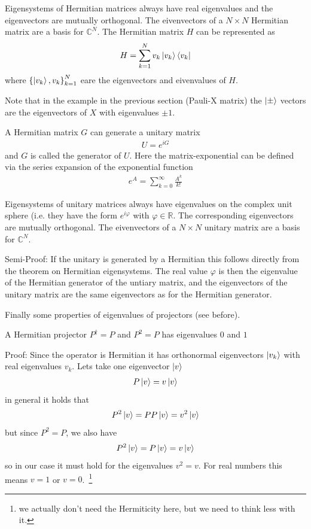 \begin{theorem*}
Eigensystems of Hermitian matrices always have real eigenvalues and the eigenvectors are mutually orthogonal. The eivenvectors of a $N\times N$ Hermitian matrix are a basis for $\mathbb{C}^N$.
The Hermitian matrix $H$ can be represented as 
\begin{align*}
    H = \sum_{k=1}^N v_k \ket{v_k}\bra{v_k}
\end{align*}
where $\left\{\ket{v_k}, v_k\right\}_{k=1}^{N}$ eare the eigenvectors and eivenvalues of $H$.
\end{theorem*}
Note that in the example in the previous section (Pauli-X matrix) the $\ket{\pm}$ vectors are the eigenvectors of $X$ with eigenvalues $\pm 1$. 

\begin{def*}[Generator]
A Hermitian matrix $G$ can generate a unitary matrix
\begin{align*}
    U = e^{iG}
\end{align*}
and $G$ is called the generator of $U$. Here the matrix-exponential can be defined via the series expansion of the exponential function
\begin{align*}
    e^{A} = \sum_{k=0}^\infty \frac{A^k}{k!}
\end{align*}
\end{def*}

\begin{theorem*}
Eigensystems of unitary matrices always have eigenvalues on the complex unit sphere (i.e. they have the form $e^{i\varphi}$ with $\varphi \in \mathbb{R}$. The corresponding eigenvectors are mutually orthogonal. The eivenvectors of a $N\times N$ unitary matrix are a basis for $\mathbb{C}^N$.
\end{theorem*}
Semi-Proof: If the unitary is generated by a Hermitian this follows directly from the theorem on Hermitian eigensystems. The real value $\varphi$ is then the eigenvalue of the Hermitian generator of the untiary matrix, and the eigenvectors of the unitary matrix are the same eigenvectors as for the Hermitian generator. 

Finally some properties of eigenvalues of projectors (see before).
\begin{theorem*}
    A Hermitian projector $P^\dagger=P$ and $P^2 = P$ has eigenvalues $0$ and $1$
\end{theorem*}
Proof: Since the operator is Hermitian it has orthonormal eigenvectors $\ket{v_k}$ with real eigenvalues $v_k$. Lets take one eigenvector $\ket{v}$
\begin{align}
    P \ket{v} = v \ket{v}
\end{align}
in general it holds that
\begin{align}
    P^2 \ket{v} = PP\ket{v} = v^2 \ket{v}
\end{align}
but since $P^2=P$, we also have
\begin{align}
    P^2 \ket{v} = P\ket{v} = v \ket{v}
\end{align}
so in our case it must hold for the eigenvalues $v^2 = v$. For real numbers this means $v=1$ or $v=0$.~\footnote{we actually don't need the Hermiticity here, but we need to think less with it.}

